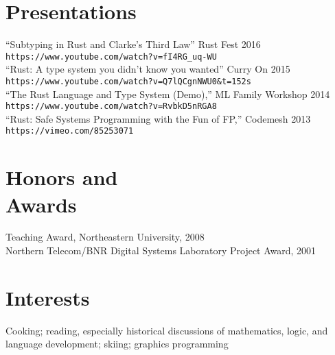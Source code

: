 \documentclass[margin,line,draft]{res}
\newcommand{\mysidestyle}{\sc}
\begin{document}
\begin{resume}
    \section{\mysidestyle Presentations}
    ``Subtyping in Rust and Clarke's Third Law'' Rust Fest 2016\\ \verb|https://www.youtube.com/watch?v=fI4RG_uq-WU|\\
    ``Rust: A type system you didn't know you wanted'' Curry On 2015\\ \verb|https://www.youtube.com/watch?v=Q7lQCgnNWU0&t=152s|\\
    ``The Rust Language and Type System (Demo),'' ML Family Workshop 2014\\  \verb|https://www.youtube.com/watch?v=RvbkD5nRGA8|\\
    ``Rust: Safe Systems Programming with the Fun of FP,'' Codemesh 2013\\ \verb|https://vimeo.com/85253071|
    \section{\mysidestyle Honors and\\Awards} 

    Teaching Award, Northeastern University, 2008 \vspace{1mm}\\%
    Northern Telecom/BNR Digital Systems Laboratory Project Award, 2001


    \section{\mysidestyle Interests}

    Cooking; 
    reading, especially historical discussions of mathematics, logic, 
    and language development; 
    skiing; 
    graphics programming

\end{resume}
\end{document}
